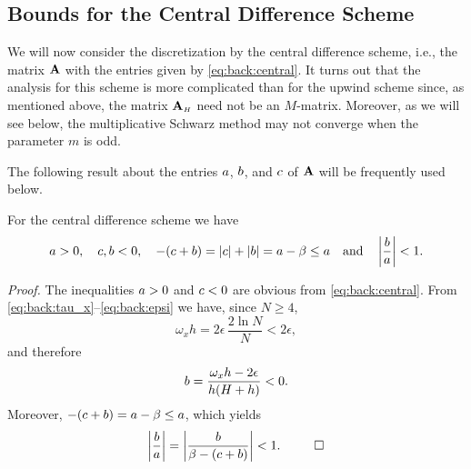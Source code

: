 \subsection{Bounds for the Central Difference Scheme}
\label{1D:SchBnds:central}

We will now consider the discretization by the central difference scheme,
i.e., the matrix $\mathbf{A}$ with the entries given by \eqref{eq:back:central}. It
turns out that the analysis for this scheme is more complicated than for the
upwind scheme since, as mentioned above, the matrix $\mathbf{A}_{\scriptscriptstyle H}$ need not be an
$M$-matrix. Moreover, as we will see below, the multiplicative Schwarz method
may not converge when the parameter $m$ is odd.


The following result about the entries $a$, $b$, and $c$
of $\mathbf{A}$ will be frequently used below.

\begin{lemma}
For the central difference scheme we have
%
\begin{equation}\label{eq:1D:bc}
a>0,\quad c, b<0,\quad
-(c+b)=|c|+|b|
= a-\beta \leq a\quad \mbox{and}\quad
\left|\frac{b}{a}\right|<1.
\end{equation}
%
\end{lemma}

{\em Proof.}
The inequalities $a>0$ and $c<0$ are obvious from
\eqref{eq:back:central}. From \eqref{eq:back:tau_x}--\eqref{eq:back:epsi} we have,
since $N\geq 4$,
%
\begin{equation}\label{eq:1D:alpha_ineq}
\omega_x h = 2\epsilon \,\frac{2\ln N}{N} < 2\epsilon,
\end{equation}
%
and therefore
%
$$b=\frac{\omega_x h-2\epsilon}{h(H+h)}<0.$$
%
Moreover, $-(c+b)=a -\beta \leq a$, which yields
%
\begin{eqnarray*}
\left|\frac{b}{a}\right|  =
\left|\frac{b}{\beta-(c+b)}\right|<1. ~~ \qed
\end{eqnarray*}
%

